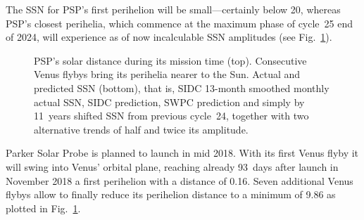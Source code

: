 The SSN for PSP's first perihelion will be small---certainly below 20, whereas PSP’s closest perihelia, which commence at the maximum phase of cycle~25 end of 2024, will experience as of now incalculable SSN amplitudes (see Fig.~\ref{fig:SPP_orbit_predicted_SSN_overview_e_plot}).
\begin{figure}
	\caption{PSP's solar distance during its mission time (top). Consecutive Venus flybys bring its perihelia nearer to the Sun. Actual and predicted SSN (bottom), that is, SIDC 13-month smoothed monthly actual SSN, SIDC prediction, SWPC prediction and simply by 11~years shifted SSN from previous cycle~24, together with two alternative trends of half and twice its amplitude.}
	\label{fig:SPP_orbit_predicted_SSN_overview_e_plot}
\end{figure}

Parker Solar Probe is planned to launch in mid 2018. With its first Venus flyby it will swing into Venus' orbital plane, reaching already 93~days after launch in November 2018 a first perihelion with a distance of \SI{0.16}{\au}. Seven additional Venus flybys allow to finally reduce its perihelion distance to a minimum of \SI{9.86}{\Rs} \citep{Fox2015} as plotted in Fig.~\ref{fig:SPP_orbit_predicted_SSN_overview_e_plot}.

